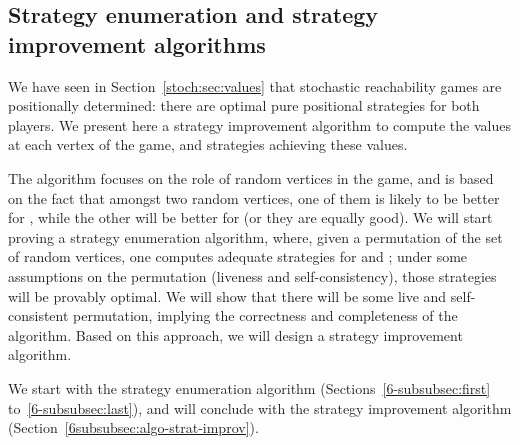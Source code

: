 

\subsection{Strategy enumeration and strategy improvement algorithms}




We have seen in Section~\ref{stoch:sec:values} that stochastic
reachability games are positionally determined: there are optimal
 pure positional strategies for both players. We present here a
strategy improvement algorithm to compute the values at each vertex of
the game, and strategies achieving these values.

The algorithm focuses on the role of random vertices in the game, and
is based on the fact that amongst two random vertices, one of them is
likely to be better for \Eve, while the other will be better for \Adam
(or they are equally good). We will start proving a strategy
enumeration algorithm, where, given a permutation of the set of random
vertices, one computes adequate strategies for \Eve and \Adam; under
some assumptions on the permutation (liveness and self-consistency),
those strategies will be provably optimal. We will show that there
will be some live and self-consistent permutation, implying the
correctness and completeness of the algorithm. Based on this approach,
we will design a strategy improvement algorithm.

We start with the strategy enumeration algorithm
(Sections~\ref{6-subsubsec:first} to~\ref{6-subsubsec:last}), and will
conclude with the strategy improvement algorithm
(Section~\ref{6subsubsec:algo-strat-improv}).




